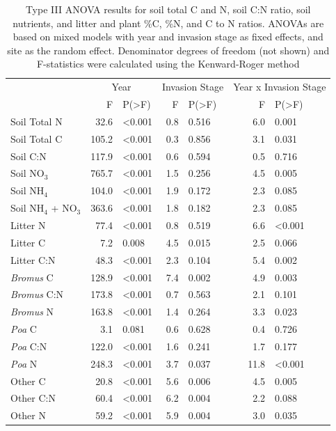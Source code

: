 \documentclass[
  11pt,
  a4paper,
]{article}
\begin{document}
\begin{table}

\caption{\label{tab:unnamed-chunk-3}Type III ANOVA results for soil total C and N, soil C:N ratio, soil nutrients, and litter and plant \%C, \%N, and C to N ratios. ANOVAs are based on mixed models with year and invasion stage as fixed effects, and site as the random effect. Denominator degrees of freedom (not shown) and F-statistics were calculated using the Kenward-Roger method}
\centering
\fontsize{8}{10}\selectfont
\begin{tabular}[t]{lrlrlrl}
\toprule
\multicolumn{1}{c}{ } & \multicolumn{2}{c}{Year} & \multicolumn{2}{c}{Invasion Stage} & \multicolumn{2}{c}{Year x Invasion Stage} \\
\cmidrule(l{3pt}r{3pt}){2-3} \cmidrule(l{3pt}r{3pt}){4-5} \cmidrule(l{3pt}r{3pt}){6-7}
 & F & P(>F) & F & P(>F) & F & P(>F)\\
\midrule
Soil Total N & 32.6 & <0.001 & 0.8 & 0.516 & 6.0 & 0.001\\
Soil Total C & 105.2 & <0.001 & 0.3 & 0.856 & 3.1 & 0.031\\
Soil C:N & 117.9 & <0.001 & 0.6 & 0.594 & 0.5 & 0.716\\
\addlinespace
Soil NO$_3$ & 765.7 & <0.001 & 1.5 & 0.256 & 4.5 & 0.005\\
Soil NH$_4$ & 104.0 & <0.001 & 1.9 & 0.172 & 2.3 & 0.085\\
Soil NH$_4$ + NO$_3$ & 363.6 & <0.001 & 1.8 & 0.182 & 2.3 & 0.085\\
\addlinespace
Litter N & 77.4 & <0.001 & 0.8 & 0.519 & 6.6 & <0.001\\
Litter C & 7.2 & 0.008 & 4.5 & 0.015 & 2.5 & 0.066\\
Litter C:N & 48.3 & <0.001 & 2.3 & 0.104 & 5.4 & 0.002\\
\addlinespace
\emph{Bromus} C & 128.9 & <0.001 & 7.4 & 0.002 & 4.9 & 0.003\\
\emph{Bromus} C:N & 173.8 & <0.001 & 0.7 & 0.563 & 2.1 & 0.101\\
\emph{Bromus} N & 163.8 & <0.001 & 1.4 & 0.264 & 3.3 & 0.023\\
\addlinespace
\emph{Poa} C & 3.1 & 0.081 & 0.6 & 0.628 & 0.4 & 0.726\\
\emph{Poa} C:N & 122.0 & <0.001 & 1.6 & 0.241 & 1.7 & 0.177\\
\emph{Poa} N & 248.3 & <0.001 & 3.7 & 0.037 & 11.8 & <0.001\\
\addlinespace
Other C & 20.8 & <0.001 & 5.6 & 0.006 & 4.5 & 0.005\\
Other C:N & 60.4 & <0.001 & 6.2 & 0.004 & 2.2 & 0.088\\
Other N & 59.2 & <0.001 & 5.9 & 0.004 & 3.0 & 0.035\\
\bottomrule
\end{tabular}
\end{table}
\end{document}
